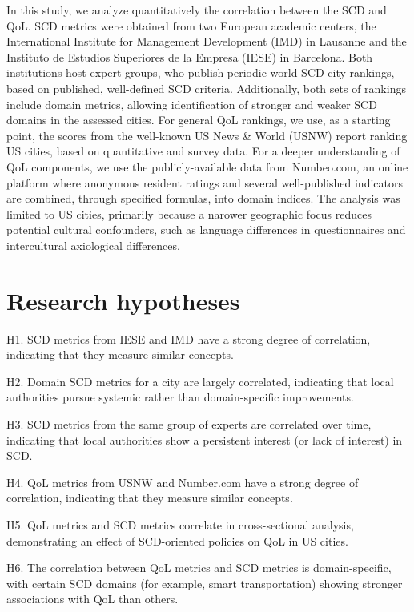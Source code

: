 \documentclass[
  english,
  12pt,
  a4paper,
]{scrartcl}
\begin{document}
In this study, we analyze quantitatively the correlation between the SCD
and QoL. SCD metrics were obtained from two European academic centers,
the International Institute for Management Development (IMD) in Lausanne
and the Instituto de Estudios Superiores de la Empresa (IESE) in
Barcelona. Both institutions host expert groups, who publish periodic
world SCD city rankings, based on published, well-defined SCD criteria.
Additionally, both sets of rankings include domain metrics, allowing
identification of stronger and weaker SCD domains in the assessed
cities. For general QoL rankings, we use, as a starting point, the
scores from the well-known US News \& World (USNW) report ranking US
cities, based on quantitative and survey data. For a deeper
understanding of QoL components, we use the publicly-available data from
Numbeo.com, an online platform where anonymous resident ratings and
several well-published indicators are combined, through specified
formulas, into domain indices. The analysis was limited to US cities,
primarily because a narower geographic focus reduces potential cultural
confounders, such as language differences in questionnaires and
intercultural axiological differences.

\section{Research hypotheses}\label{research-hypotheses}

H1. SCD metrics from IESE and IMD have a strong degree of correlation,
indicating that they measure similar concepts.

H2. Domain SCD metrics for a city are largely correlated, indicating
that local authorities pursue systemic rather than domain-specific
improvements.

H3. SCD metrics from the same group of experts are correlated over time,
indicating that local authorities show a persistent interest (or lack of
interest) in SCD.

H4. QoL metrics from USNW and Number.com have a strong degree of
correlation, indicating that they measure similar concepts.

H5. QoL metrics and SCD metrics correlate in cross-sectional analysis,
demonstrating an effect of SCD-oriented policies on QoL in US cities.

H6. The correlation between QoL metrics and SCD metrics is
domain-specific, with certain SCD domains (for example, smart
transportation) showing stronger associations with QoL than others.
\end{document}
